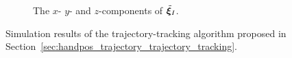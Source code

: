 \begin{figure}[htb]
\begin{minipage}{0.48\textwidth}

        \begin{subfigure}{\textwidth}
            \hspace*{-5mm}
            
            \vspace*{-8mm}
            \caption{The $x$- $y$- and $z$-components of $\tilde{\bm{\xi}}_I$.}
            \label{fig:trajectory_integral}
        \end{subfigure}
        \vspace*{-8mm}
    \end{minipage}
    \caption{Simulation results of the trajectory-tracking algorithm proposed in Section~\ref{sec:handpos_trajectory_trajectory_tracking}.
    }
    \label{fig:trajectory_tracking}
\end{figure}
